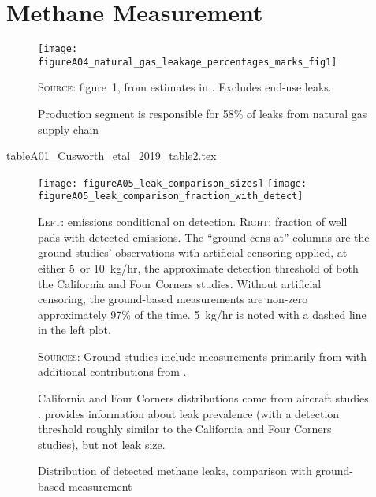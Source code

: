 \newpage
\section{Methane Measurement}
\label{app:methane-measurement}

\begin{figure}[!hbtp]
\caption{Production segment is responsible for 58\% of leaks from natural gas supply chain}
\vspace*{1\baselineskip}

\label{fig:EPA-leak-percentages-Marks}

\texttt{[image: figureA04\_natural\_gas\_leakage\_percentages\_marks\_fig1]}

\textsc{Source:} \textcite{Marks:2021} figure~1, from estimates in \textcite{Alvarez/etal:2018}.
Excludes end-use leaks.
\end{figure}

\begin{table}[!bth]
\centering
{tableA01_Cusworth_etal_2019_table2.tex}
\end{table}



\begin{figure}[!bth]
\caption{Distribution of detected methane leaks, comparison with ground-based measurement}
\label{fig:app-leak-sizes}
\texttt{[image: figureA05\_leak\_comparison\_sizes]}
\texttt{[image: figureA05\_leak\_comparison\_fraction\_with\_detect]}

\textsc{Left:} emissions conditional on detection.
\textsc{Right:} fraction of well pads with detected emissions.
The ``ground cens at'' columns are the ground studies' observations with artificial censoring applied, at either 5~or 10~kg/hr, the approximate detection threshold of both the California and Four Corners studies.
Without artificial censoring, the ground-based measurements are non-zero approximately 97\% of the time.
5~kg/hr is noted with a dashed line in the left plot.

\textsc{Sources:}
Ground studies include measurements primarily from
\textcite{Robertson/Edie/Snare/Soltis/Field/Burkhart/Bell/Zimmerle/Murphy:2017}
with additional contributions from
\textcite{
Rella/Tsai/Botkin/Crosson/Steele:2015,
Omara/Sullivan/Li/Subramanian/Robinson/Presto:2016,
Omara/Zimmerman/Sullivan/Li/Ellis/Cesa/Subramanian/Presto/Robinson:2018,
}.

California and Four Corners distributions come from aircraft studies \parencite{Duren/etal:2019, Frankenberg/etal:2016}.
\textcite{Lyon/Alvarez/Zavala-Araiza/Brandt/Jackson/Hamburg:2016}
provides information about leak prevalence (with a detection threshold roughly similar to the California and Four Corners studies), but not leak size.
\end{figure}



